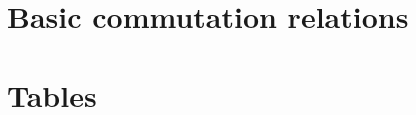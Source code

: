 \clearpage
\appendix

\chapter{Basic commutation relations}
\label{App:AppendixB}


\chapter{Tables}
 \label{App:AppendixA}





